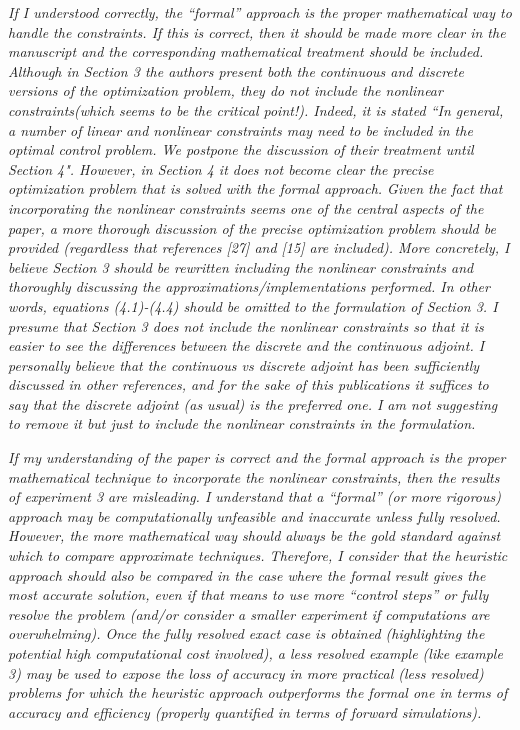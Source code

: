\documentclass{article}
\begin{document}
{\it If I understood correctly, the ``formal'' approach is the proper mathematical way to handle the constraints. If this is correct, then it should be made more clear in the manuscript and the corresponding mathematical treatment should be included. Although in Section 3 the authors present both the continuous and discrete versions of the optimization problem, they do not include the nonlinear constraints(which seems to be the critical point!). Indeed, it is stated ``In general, a number of linear and nonlinear constraints may need to be included in the optimal control problem. We postpone the discussion of their treatment until Section 4". However, in Section 4 it does not become clear the precise optimization problem that is solved with the formal approach. Given the fact that incorporating the nonlinear constraints seems one of the central aspects of the paper, a more thorough discussion of the precise optimization problem should be provided (regardless that references [27] and [15] are included). More concretely, I believe Section 3 should be rewritten including the nonlinear constraints and thoroughly discussing the approximations/implementations performed. In other words, equations (4.1)-(4.4) should be omitted to the formulation of Section 3. I presume that Section 3 does not include the nonlinear constraints so that it is easier to see the differences between the discrete and the continuous adjoint. I personally believe that the continuous vs discrete adjoint has been sufficiently discussed in other references, and for the sake of this publications it suffices to say that the discrete adjoint (as usual) is the preferred one. I am not suggesting to remove it but just to include the nonlinear constraints in the formulation.}

{\it If my understanding of the paper is correct and the formal approach is the proper mathematical technique to incorporate the nonlinear constraints, then the results of experiment 3 are misleading. I understand that a ``formal'' (or more rigorous) approach may be computationally unfeasible and inaccurate unless fully resolved. However, the more mathematical way should always be the gold standard against which to compare approximate techniques. Therefore, I consider that the heuristic approach should also be compared in the case where the formal result gives the most accurate solution, even if that means to use more ``control steps'' or fully resolve the problem (and/or consider a smaller experiment if computations are overwhelming). Once the fully resolved exact case is obtained (highlighting the potential high computational cost involved), a less resolved example (like example 3) may be used to expose the loss of accuracy in more practical (less resolved) problems for which the heuristic approach outperforms the formal one in terms of accuracy and efficiency (properly quantified in terms of forward simulations).}
\end{document}
